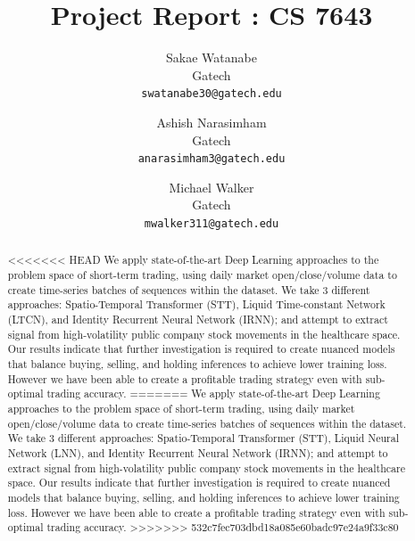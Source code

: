\documentclass[10pt,twocolumn,letterpaper]{article}
\begin{document}
\title{Project Report : CS 7643}

\author{Sakae Watanabe\\
Gatech\\
{\tt\small swatanabe30@gatech.edu}
\and
Ashish Narasimham\\
Gatech\\
{\tt\small anarasimham3@gatech.edu}
\and
Michael Walker\\
Gatech\\
{\tt\small mwalker311@gatech.edu}
}

\maketitle

\begin{abstract}
<<<<<<< HEAD
    We apply state-of-the-art Deep Learning approaches to the problem space of short-term trading, using daily market open/close/volume data to create time-series batches of sequences within the dataset. We take 3 different approaches: Spatio-Temporal Transformer (STT), Liquid Time-constant Network (LTCN), and Identity Recurrent Neural Network (IRNN); and attempt to extract signal from high-volatility public company stock movements in the healthcare space. Our results indicate that further investigation is required to create nuanced models that balance buying, selling, and holding inferences to achieve lower training loss. However we have been able to create a profitable trading strategy even with sub-optimal trading accuracy.
=======
    We apply state-of-the-art Deep Learning approaches to the problem space of short-term trading, using daily market open/close/volume data to create time-series batches of sequences within the dataset. We take 3 different approaches: Spatio-Temporal Transformer (STT), Liquid Neural Network (LNN), and Identity Recurrent Neural Network (IRNN); and attempt to extract signal from high-volatility public company stock movements in the healthcare space. Our results indicate that further investigation is required to create nuanced models that balance buying, selling, and holding inferences to achieve lower training loss. However we have been able to create a profitable trading strategy even with sub-optimal trading accuracy.
>>>>>>> 532c7fec703dbd18a085e60badc97e24a9f33c80

\end{abstract}
\end{document}
